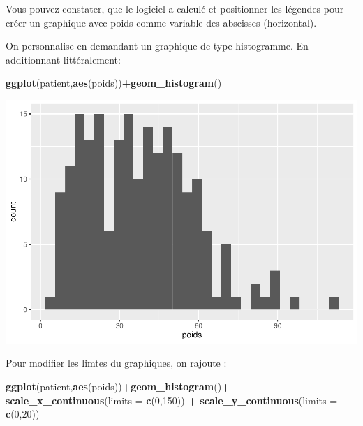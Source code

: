 \documentclass[
]{book}
\newenvironment{Shaded}{\begin{snugshade}}{\end{snugshade}}
\newcommand{\AttributeTok}[1]{\textcolor[rgb]{0.13,0.29,0.53}{#1}}
\newcommand{\DecValTok}[1]{\textcolor[rgb]{0.00,0.00,0.81}{#1}}
\newcommand{\FunctionTok}[1]{\textcolor[rgb]{0.13,0.29,0.53}{\textbf{#1}}}
\newcommand{\NormalTok}[1]{#1}
\newcommand{\SpecialCharTok}[1]{\textcolor[rgb]{0.81,0.36,0.00}{\textbf{#1}}}
\begin{document}
Vous pouvez constater, que le logiciel a calculé et positionner les légendes
pour créer un graphique avec poids comme variable des abscisses (horizontal).

On personnalise en demandant un graphique de type histogramme. En additionnant
littéralement:

\begin{Shaded}
\begin{Highlighting}[]
\FunctionTok{ggplot}\NormalTok{(patient,}\FunctionTok{aes}\NormalTok{(poids))}\SpecialCharTok{+}\FunctionTok{geom\_histogram}\NormalTok{()}
\end{Highlighting}
\end{Shaded}

\includegraphics{_main_files/figure-latex/ggplot3-1.pdf}

Pour modifier les limtes du graphiques, on rajoute :

\begin{Shaded}
\begin{Highlighting}[]
\FunctionTok{ggplot}\NormalTok{(patient,}\FunctionTok{aes}\NormalTok{(poids))}\SpecialCharTok{+}\FunctionTok{geom\_histogram}\NormalTok{()}\SpecialCharTok{+}
  \FunctionTok{scale\_x\_continuous}\NormalTok{(}\AttributeTok{limits =} \FunctionTok{c}\NormalTok{(}\DecValTok{0}\NormalTok{,}\DecValTok{150}\NormalTok{)) }\SpecialCharTok{+}
  \FunctionTok{scale\_y\_continuous}\NormalTok{(}\AttributeTok{limits =} \FunctionTok{c}\NormalTok{(}\DecValTok{0}\NormalTok{,}\DecValTok{20}\NormalTok{))}
\end{Highlighting}
\end{Shaded}
\end{document}
